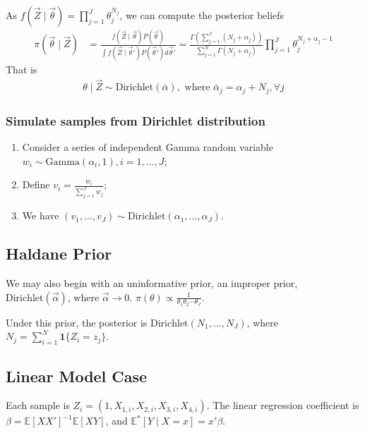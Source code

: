 \documentclass[11pt]{elegantbook}
\begin{document}
As $f(\vec{Z}\mid\vec{\theta})=\prod_{j=1}^J\theta_j^{N_j}$, we can compute the posterior beliefs
\begin{equation}
    \begin{aligned}
        \pi(\vec{\theta}\mid \vec{Z})&=\frac{f(\vec{Z}\mid \vec{\theta})P(\vec{\theta})}{\int f(\vec{Z}\mid \vec{\theta}')P(\vec{\theta}')d\vec{\theta}'}=\frac{\Gamma(\sum_{j=1}^J (N_j+\alpha_j))}{\sum_{j=1}^N\Gamma(N_j+\alpha_j)}\prod_{j=1}^J\theta_j^{N_j+\alpha_j-1}
    \end{aligned}
    \nonumber
\end{equation}
That is
\begin{equation}
    \begin{aligned}
        \theta\mid\vec{Z}\sim \text{Dirichlet}(\bar{\alpha}), \text{ where }\bar{\alpha}_j=\alpha_j+N_j, \forall j
    \end{aligned}
    \nonumber
\end{equation}
\subsubsection*{Simulate samples from Dirichlet distribution}
\begin{definition}
    \normalfont
    \begin{enumerate}[1.]
        \item Consider a series of independent Gamma random variable $w_i\sim \text{Gamma}(\alpha_i,1), i=1,...,J$;
        \item Define $v_i=\frac{w_i}{\sum_{j=1}^J w_j}$;
        \item We have $(v_1,...,v_J)\sim \text{Dirichlet}(\alpha_1,...,\alpha_J)$.
    \end{enumerate}
\end{definition}

\subsection{Haldane Prior}
We may also begin with an uninformative prior, an improper prior, $\text{Dirichlet}(\vec{\alpha})$, where $\vec{\alpha} \rightarrow 0$. $\pi(\theta)\varpropto \frac{1}{\theta_1\theta_2\cdots\theta_J}$.

Under this prior, the posterior is $\text{Dirichlet}(N_1,...,N_J)$, where $N_j=\sum_{i=1}^N \mathbf{1}\{Z_i=z_j\}$.

\subsection{Linear Model Case}
Each sample is $Z_i=(1,X_{1,i},X_{2,i},X_{3,i},X_{4,i})$. The linear regression coefficient is $\beta=\mathbb{E}[XX']^{-1}\mathbb{E}[XY]$, and $\mathbb{E}^*[Y\mid X=x]=x'\beta$.
\end{document}
